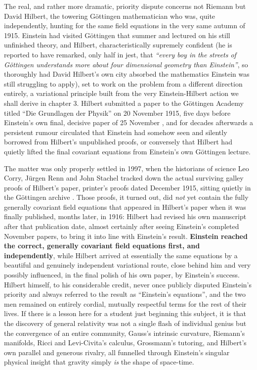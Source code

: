     The real, and rather more dramatic, priority dispute concerns not Riemann but David Hilbert, the towering G\"{o}ttingen mathematician who was, quite independently, hunting for the same field equations in the very same autumn of 1915. Einstein had visited G\"{o}ttingen that summer and lectured on his still unfinished theory, and Hilbert, characteristically supremely confident (he is reported to have remarked, only half in jest, that \textit{``every boy in the streets of G\"{o}ttingen understands more about four dimensional geometry than Einstein''}, so thoroughly had David Hilbert's own city absorbed the mathematics Einstein was still struggling to apply), set to work on the problem from a different direction entirely, a variational principle built from the very Einstein-Hilbert action we shall derive in chapter 3. Hilbert submitted a paper to the G\"{o}ttingen Academy titled ``Die Grundlagen der Physik'' on 20 November 1915, five days before Einstein's own final, decisive paper of 25 November \citep{hilbert1915}, and for decades afterwards a persistent rumour circulated that Einstein had somehow seen and silently borrowed from Hilbert's unpublished proofs, or conversely that Hilbert had quietly lifted the final covariant equations from Einstein's own G\"{o}ttingen lecture.

    The matter was only properly settled in 1997, when the historians of science Leo Corry, J\"{u}rgen Renn and John Stachel tracked down the actual surviving galley proofs of Hilbert's paper, printer's proofs dated December 1915, sitting quietly in the G\"{o}ttingen archive \citep{corry1997}. Those proofs, it turned out, did \textit{not} yet contain the fully generally covariant field equations that appeared in Hilbert's paper when it was finally published, months later, in 1916: Hilbert had revised his own manuscript after that publication date, almost certainly after seeing Einstein's completed November papers, to bring it into line with Einstein's result. \textbf{Einstein reached the correct, generally covariant field equations first, and independently}, while Hilbert arrived at essentially the same equations by a beautiful and genuinely independent variational route, close behind him and very possibly influenced, in the final polish of his own paper, by Einstein's success. Hilbert himself, to his considerable credit, never once publicly disputed Einstein's priority and always referred to the result as ``Einstein's equations'', and the two men remained on entirely cordial, mutually respectful terms for the rest of their lives. If there is a lesson here for a student just beginning this subject, it is that the discovery of general relativity was not a single flash of individual genius but the convergence of an entire community, Gauss's intrinsic curvature, Riemann's manifolds, Ricci and Levi-Civita's calculus, Grossmann's tutoring, and Hilbert's own parallel and generous rivalry, all funnelled through Einstein's singular physical insight that gravity simply \textit{is} the shape of space-time.

